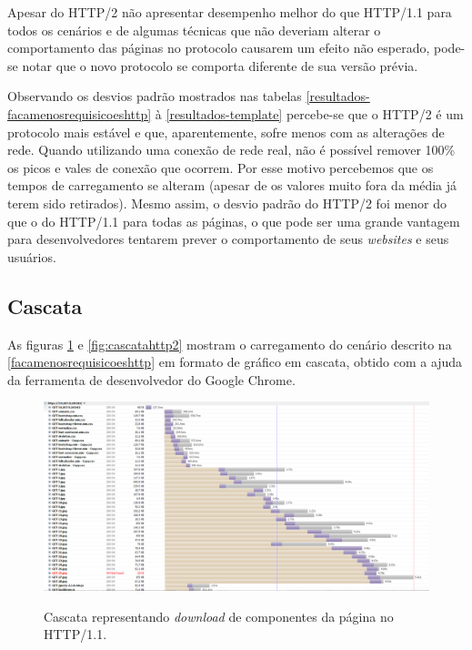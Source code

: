 Apesar do HTTP/2 não apresentar desempenho melhor do que HTTP/1.1 para todos os cenários e de algumas técnicas que não deveriam alterar o comportamento das páginas no protocolo causarem um efeito não esperado, pode-se notar que o novo protocolo se comporta diferente de sua versão prévia.

Observando os desvios padrão mostrados nas tabelas \ref{resultados-facamenosrequisicoeshttp} à \ref{resultados-template} percebe-se que o HTTP/2 é um protocolo mais estável e que, aparentemente, sofre menos com as alterações de rede. Quando utilizando uma conexão de rede real, não é possível remover 100\% os picos e vales de conexão que ocorrem. Por esse motivo percebemos que os tempos de carregamento se alteram (apesar de os valores muito fora da média já terem sido retirados). Mesmo assim, o desvio padrão do HTTP/2 foi menor do que o do HTTP/1.1 para todas as páginas, o que pode ser uma grande vantagem para desenvolvedores tentarem prever o comportamento de seus \textit{websites} e seus usuários.

\subsection{Cascata}
\label{cascata}

As figuras \ref{fig:cascatahttp11} e \ref{fig:cascatahttp2} mostram o carregamento do cenário descrito na \autoref{facamenosrequisicoeshttp} em formato de gráfico em cascata, obtido com a ajuda da ferramenta de desenvolvedor do Google Chrome.

\begin{landscape}
	\begin{figure}[!htbp]
    	\centering
	    \caption{Cascata representando \textit{download} de componentes da página no HTTP/1.1.}
    	\includegraphics[width=1.5\textwidth]{./04-figuras/analise-de-resultados/cascata_http11}
	    \label{fig:cascatahttp11}
	\end{figure}
\end{landscape}

